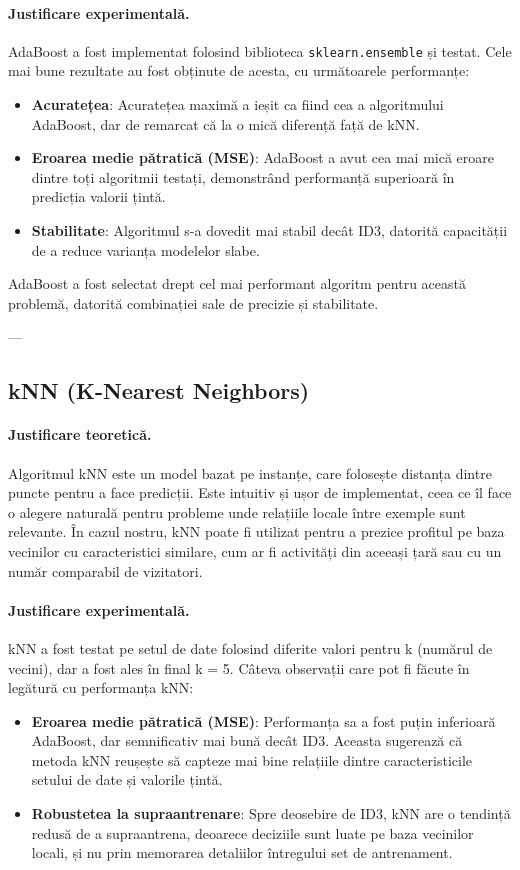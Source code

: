\documentclass{article}
\begin{document}
\paragraph{Justificare experimentală.}  
AdaBoost a fost implementat folosind biblioteca \texttt{sklearn.ensemble} și testat. Cele mai bune rezultate au fost obținute de acesta, cu următoarele performanțe:
\begin{itemize}
    \item \textbf{Acuratețea}: Acuratețea maximă a ieșit ca fiind cea a algoritmului AdaBoost, dar de remarcat că la o mică diferență față de kNN.
    \item \textbf{Eroarea medie pătratică (MSE)}: AdaBoost a avut cea mai mică eroare dintre toți algoritmii testați, demonstrând performanță superioară în predicția valorii țintă.
    \item \textbf{Stabilitate}: Algoritmul s-a dovedit mai stabil decât ID3, datorită capacității de a reduce varianța modelelor slabe.
\end{itemize}

AdaBoost a fost selectat drept cel mai performant algoritm pentru această problemă, datorită combinației sale de precizie și stabilitate.

---

\subsection*{kNN (K-Nearest Neighbors)}

\paragraph{Justificare teoretică.}  
Algoritmul kNN este un model bazat pe instanțe, care folosește distanța dintre puncte pentru a face predicții. Este intuitiv și ușor de implementat, ceea ce îl face o alegere naturală pentru probleme unde relațiile locale între exemple sunt relevante. În cazul nostru, kNN poate fi utilizat pentru a prezice profitul pe baza vecinilor cu caracteristici similare, cum ar fi activități din aceeași țară sau cu un număr comparabil de vizitatori.

\paragraph{Justificare experimentală.}  
kNN a fost testat pe setul de date folosind diferite valori pentru k (numărul de vecini), dar a fost ales în final k = 5. Câteva observații care pot fi făcute în legătură cu performanța kNN:
\begin{itemize} 
    \item \textbf{Eroarea medie pătratică (MSE)}: Performanța sa a fost puțin inferioară AdaBoost, dar semnificativ mai bună decât ID3. Aceasta sugerează că metoda kNN reușește să capteze mai bine relațiile dintre caracteristicile setului de date și valorile țintă.
    \item \textbf{Robustetea la supraantrenare}: Spre deosebire de ID3, kNN are o tendință redusă de a supraantrena, deoarece deciziile sunt luate pe baza vecinilor locali, și nu prin memorarea detaliilor întregului set de antrenament.
\end{itemize}
\end{document}
